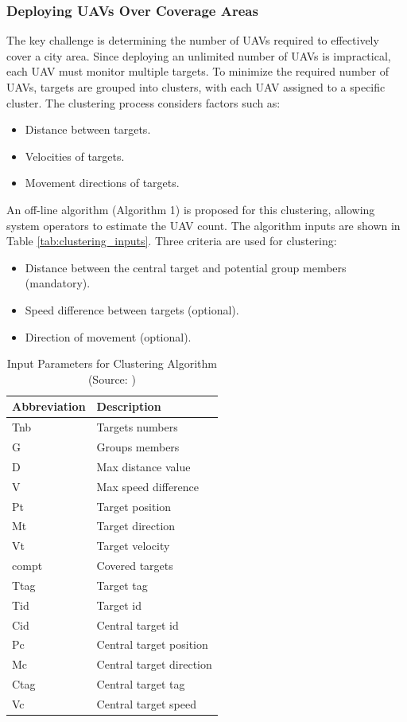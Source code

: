 \subsubsection{Deploying UAVs Over Coverage Areas}
The key challenge is determining the number of UAVs required to effectively cover a city area. Since deploying an unlimited number of UAVs is impractical, each UAV must monitor multiple targets. To minimize the required number of UAVs, targets are grouped into clusters, with each UAV assigned to a specific cluster. The clustering process considers factors such as:
\begin{itemize}
    \item Distance between targets.
    \item Velocities of targets.
    \item Movement directions of targets.
\end{itemize}

An off-line algorithm (Algorithm 1) is proposed for this clustering, allowing system operators to estimate the UAV count. The algorithm inputs are shown in Table \ref{tab:clustering_inputs}. Three criteria are used for clustering:
\begin{itemize}
    \item Distance between the central target and potential group members (mandatory).
    \item Speed difference between targets (optional).
    \item Direction of movement (optional).
\end{itemize}

\begin{table}[H]
    \centering
    \begin{tabular}{|l|l|}
    \hline
    \textbf{Abbreviation} & \textbf{Description} \\ \hline
    Tnb & Targets numbers \\ \hline
    G & Groups members \\ \hline
    D & Max distance value \\ \hline
    V & Max speed difference \\ \hline
    Pt & Target position \\ \hline
    Mt & Target direction \\ \hline
    Vt & Target velocity \\ \hline
    compt & Covered targets \\ \hline
    Ttag & Target tag \\ \hline
    Tid & Target id \\ \hline
    Cid & Central target id \\ \hline
    Pc & Central target position \\ \hline
    Mc & Central target direction \\ \hline
    Ctag & Central target tag \\ \hline
    Vc & Central target speed \\ \hline
    \end{tabular}
    \caption{Input Parameters for Clustering Algorithm (Source: \cite{elloumi2018monitoring})}
\end{table}


